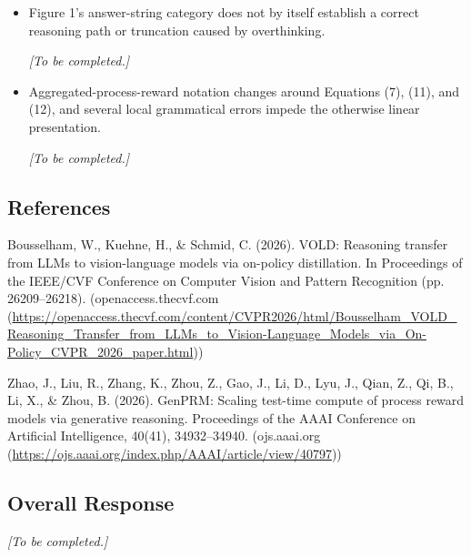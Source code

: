 \documentclass[11pt,a4paper]{article}
\begin{document}
\begin{itemize}
\item Figure 1's answer-string category does not by itself establish a correct reasoning path or truncation caused by overthinking.
\par{}
\begin{responsebox}[frametitle={Response to M5},nobreak=true]
\textit{[To be completed.]}\par\vspace{1em}
\end{responsebox}

\item Aggregated-process-reward notation changes around Equations (7), (11), and (12), and several local grammatical errors impede the otherwise linear presentation.
\par{}
\begin{responsebox}[frametitle={Response to M6},nobreak=true]
\textit{[To be completed.]}\par\vspace{1em}
\end{responsebox}

\end{itemize}

\subsection*{References}
Bousselham, W., Kuehne, H., \& Schmid, C. (2026). VOLD: Reasoning transfer from LLMs to vision-language models via on-policy distillation. In Proceedings of the IEEE/CVF Conference on Computer Vision and Pattern Recognition (pp. 26209--26218). (openaccess.thecvf.com (\url{https://openaccess.thecvf.com/content/CVPR2026/html/Bousselham_VOLD_Reasoning_Transfer_from_LLMs_to_Vision-Language_Models_via_On-Policy_CVPR_2026_paper.html}))

Zhao, J., Liu, R., Zhang, K., Zhou, Z., Gao, J., Li, D., Lyu, J., Qian, Z., Qi, B., Li, X., \& Zhou, B. (2026). GenPRM: Scaling test-time compute of process reward models via generative reasoning. Proceedings of the AAAI Conference on Artificial Intelligence, 40(41), 34932--34940. (ojs.aaai.org (\url{https://ojs.aaai.org/index.php/AAAI/article/view/40797}))

\subsection*{Overall Response}
\par{}
\begin{responsebox}[frametitle={Overall Response to AI Review},nobreak=true]
\textit{[To be completed.]}\par\vspace{1em}
\end{responsebox}
\end{document}
